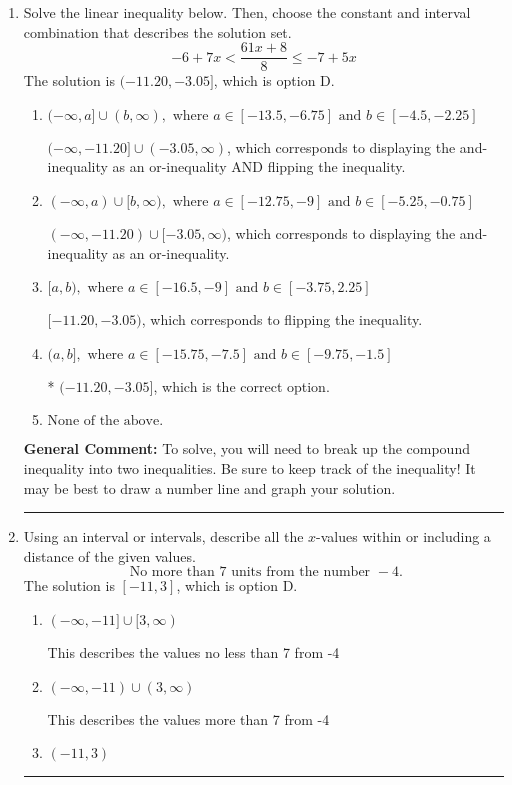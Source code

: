 \documentclass{extbook}[14pt]
\newcommand{\litem}[1]{\item #1

\rule{\textwidth}{0.4pt}}
\begin{document}
\begin{enumerate}\litem{
Solve the linear inequality below. Then, choose the constant and interval combination that describes the solution set.
\[ -6 + 7 x < \frac{61 x + 8}{8} \leq -7 + 5 x \]The solution is \( (-11.20, -3.05] \), which is option D.\begin{enumerate}[label=\Alph*.]
\item \( (-\infty, a] \cup (b, \infty), \text{ where } a \in [-13.5, -6.75] \text{ and } b \in [-4.5, -2.25] \)

$(-\infty, -11.20] \cup (-3.05, \infty)$, which corresponds to displaying the and-inequality as an or-inequality AND flipping the inequality.
\item \( (-\infty, a) \cup [b, \infty), \text{ where } a \in [-12.75, -9] \text{ and } b \in [-5.25, -0.75] \)

$(-\infty, -11.20) \cup [-3.05, \infty)$, which corresponds to displaying the and-inequality as an or-inequality.
\item \( [a, b), \text{ where } a \in [-16.5, -9] \text{ and } b \in [-3.75, 2.25] \)

$[-11.20, -3.05)$, which corresponds to flipping the inequality.
\item \( (a, b], \text{ where } a \in [-15.75, -7.5] \text{ and } b \in [-9.75, -1.5] \)

* $(-11.20, -3.05]$, which is the correct option.
\item \( \text{None of the above.} \)


\end{enumerate}

\textbf{General Comment:} To solve, you will need to break up the compound inequality into two inequalities. Be sure to keep track of the inequality! It may be best to draw a number line and graph your solution.
}
\litem{
Using an interval or intervals, describe all the $x$-values within or including a distance of the given values.
\[ \text{ No more than } 7 \text{ units from the number } -4. \]The solution is \( [-11, 3] \), which is option D.\begin{enumerate}[label=\Alph*.]
\item \( (-\infty, -11] \cup [3, \infty) \)

This describes the values no less than 7 from -4
\item \( (-\infty, -11) \cup (3, \infty) \)

This describes the values more than 7 from -4
\item \( (-11, 3) \)


\end{enumerate}}
\end{enumerate}
\end{document}
